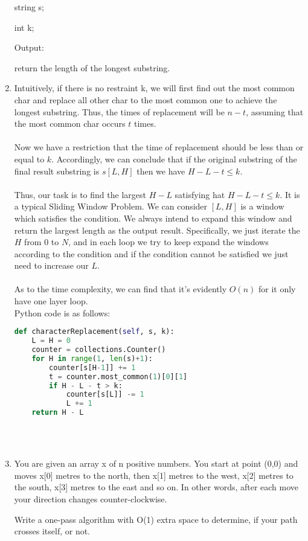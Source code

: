 \documentclass[12pt,a4paper]{article}
\makeatletter
\newtheorem*{solution}{Solution}
\renewenvironment{solution}[1][Solution] {\par\pushQED{\qed}\normalfont\topsep6\p@\@plus6\p@\relax\trivlist\item[\hskip\labelsep\bfseries#1\@addpunct{.}]\ignorespaces}{\popQED\endtrivlist\@endpefalse} \makeatother
\makeatother
\begin{document}
\begin{enumerate}
string s;

int k;

Output:

return the length of the longest substring.


\begin{solution}
Intuitively, if there is no restraint k, we will first find out the most common char and replace all other char to the most common one to achieve the longest substring. Thus, the times of replacement will be $n-t$, assuming that the most common char occurs $t$ times. \\ \\ Now we have a restriction that the time of replacement should be less than or equal to $k$. Accordingly, we can conclude that if the original substring of the final result substring is $s[L,H]$ then we have $H-L-t \le k$.\\ \\
Thus, our task is to find the largest $H-L$ satisfying hat $H-L-t \le k$. It is a typical Sliding Window Problem. We can consider $[L,H]$ is a window which satisfies the condition. We always intend to expand this window and return the largest length as the output result. Specifically, we just iterate the $H$ from $0$ to $N$, and in each loop we try to keep expand the windows according to the condition and if the condition cannot be satisfied we just need to increase our $L$.\\ \\
As to the time complexity, we can find that it's evidently $O(n)$ for it only have one layer loop.
\\ Python code is as follows:


\begin{lstlisting}[language=Python] 
def characterReplacement(self, s, k):
    L = H = 0
    counter = collections.Counter()
    for H in range(1, len(s)+1):
        counter[s[H-1]] += 1
        t = counter.most_common(1)[0][1]
        if H - L - t > k:
            counter[s[L]] -= 1
            L += 1
    return H - L
\end{lstlisting} 

\end{solution}

~\\
~\\


\item You are given an array x of n positive numbers. You start at point (0,0) and moves x[0] metres to the north, then x[1] metres to the west, x[2] metres to the south, x[3] metres to the east and so on. In other words, after each move your direction changes counter-clockwise.

Write a one-pass algorithm with O(1) extra space to determine, if your path crosses itself, or not.



~\\
~\\

\end{enumerate}
\end{document}
